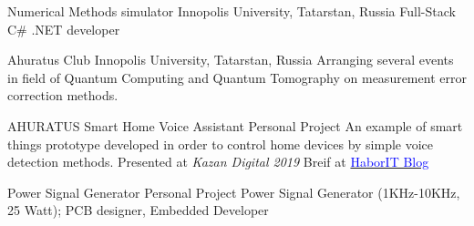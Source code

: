     {Numerical Methods simulator}
    {Innopolis University, Tatarstan, Russia}{}{}
    {Full-Stack C\# .NET developer}


    {Ahuratus Club}
    {Innopolis University, Tatarstan, Russia}{}{}
    {Arranging several events in field of Quantum Computing and Quantum Tomography on  measurement error correction methods.}

    {AHURATUS Smart Home Voice Assistant}
    {Personal Project}{}{}
    {An example of smart things prototype developed in order to control home devices by simple voice detection methods. Presented at \textit{Kazan Digital 2019} Breif at \href{https://habr.com/en/post/475960/}{\textcolor{blue}{Habor\texttrademark IT Blog}}}

    {Power Signal Generator}
    {Personal Project}{}{}
    {Power Signal Generator (1KHz-10KHz, 25 Watt); PCB designer, Embedded Developer}
